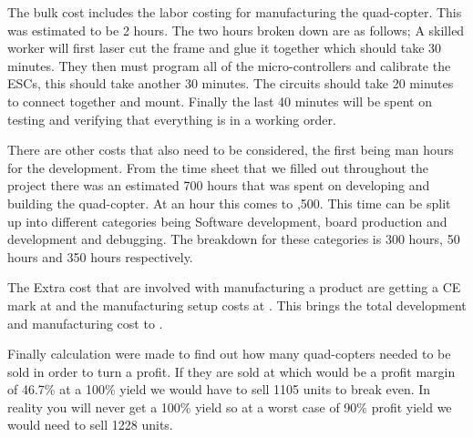 \documentclass[a4paper,11pt]{article}
\begin{document}
\newline
The bulk cost includes the labor costing for manufacturing the quad-copter. This was estimated to be 2 hours. The two hours broken down are as follows; A skilled worker will first laser cut the frame and glue it together which should take 30 minutes. They then must program all of the micro-controllers and calibrate the ESCs, this should take another 30 minutes. The circuits should take 20 minutes to connect together and mount. Finally the last 40 minutes will be spent on testing and verifying that everything is in a working order.  

There are other costs that also need to be considered, the first being man hours for the development. From the time sheet that we filled out throughout the project there was an estimated 700 hours that was spent on developing and building the quad-copter. At  an hour this comes to ,500. This time can be split up into different categories being Software development, board production and development and debugging. The breakdown for these categories is 300 hours, 50 hours and 350 hours respectively. 

The Extra cost that are involved with manufacturing a product are getting a CE mark at  and the manufacturing setup costs at .
This brings the total development and manufacturing cost to .

Finally calculation were made to find out how many quad-copters needed to be sold in order to turn a profit. If they are sold at  which would be a profit margin of 46.7\% at a 100\% yield we would have to sell 1105 units to break even. In reality you will never get a 100\% yield so at a worst case of 90\% profit yield we would need to sell 1228 units. 
\end{document}
